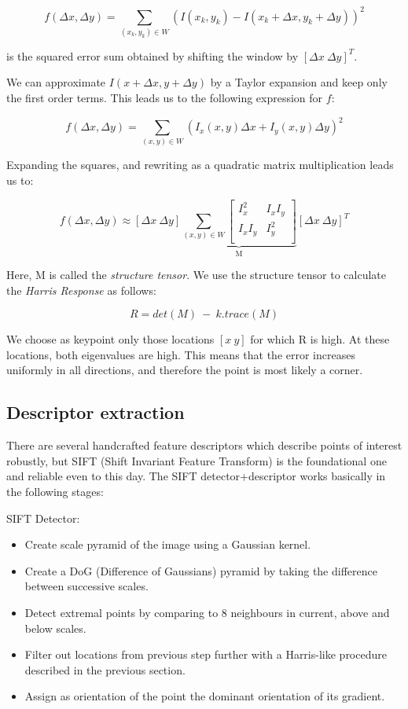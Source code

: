 \[f(\Delta x, \Delta y) = \sum_{(x_k, y_k) \in W}^{}(I(x_k, y_k) - I(x_k + \Delta x, y_k + \Delta y))^2\]

is the squared error sum obtained by shifting the window by $[\Delta x \ \Delta y]^T$.

We can approximate $I(x + \Delta x, y + \Delta y)$ by a Taylor expansion and keep only the first order terms. This leads us to the following expression for $f$:

\[f(\Delta x, \Delta y) = \sum_{(x, y) \in W}(I_x(x, y)\Delta x + I_y(x, y) \Delta y)^2\]

Expanding the squares, and rewriting as a quadratic matrix multiplication leads us to:

\[f(\Delta x, \Delta y) \approx [\Delta x \ \Delta y]\underbrace{\sum_{(x, y) \in W}\begin{bmatrix}
I_x^2 & I_xI_y\\
I_xI_y & I_y^2\\
\end{bmatrix}}_{\text{M}}[\Delta x \ \Delta y]^T\]

Here, M is called the \emph{structure tensor}. We use the structure tensor to calculate the \emph{Harris Response} as follows:

\[R = det(M)\ -\ k.trace(M)\]

We choose as keypoint only those locations $[x\ y]$ for which R is high. At these locations, both eigenvalues are high. This means  that the error increases uniformly in all directions, and therefore the point is most likely a corner. 

\subsection{Descriptor extraction}
There are several handcrafted feature descriptors which describe points of interest robustly, but SIFT (Shift Invariant Feature Transform) is the foundational one and reliable even to this day. The SIFT detector+descriptor works basically in the following stages:

SIFT Detector:
\begin{itemize}
\item Create scale pyramid of the image using a Gaussian kernel.
\item Create a DoG (Difference of Gaussians) pyramid by taking the difference between successive scales.
\item Detect extremal points by comparing to 8 neighbours in current, above and below scales.  
\item Filter out locations from previous step further with a Harris-like procedure described in the previous section.
\item Assign as orientation of the point the dominant orientation of its gradient.
\end{itemize}

